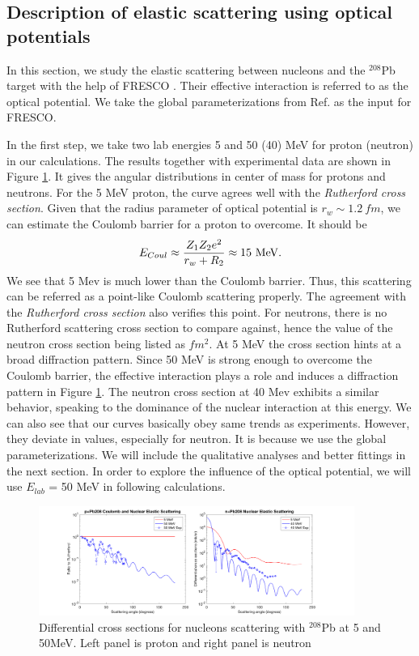 \subsection{Description of elastic scattering using optical potentials}
	In this section, we study the elastic scattering between nucleons and the $^{208}$Pb target with the help of FRESCO\cite{FRESCO} . Their effective interaction is referred to as the optical potential. We take the global parameterizations from Ref. \cite{capote2009ripl,koning2003local} as the input for FRESCO.
	
	In the first step, we take two lab energies 5 and 50 (40) MeV for proton (neutron) in our calculations. The results together with experimental data are shown in Figure \ref{fig:angulardistribution}. It gives the angular distributions in center of mass for protons and neutrons. For the 5 MeV proton, the curve agrees well with the \emph{Rutherford cross section}. Given that the radius parameter of optical potential is $r_w\sim1.2\ fm$, we can estimate the Coulomb barrier for a proton to overcome. It should be 
	\begin{equation}
	E_{Coul}\approx\frac{Z_1Z_2e^2}{r_w+R_2}\approx15\ \rm{MeV}.
	\end{equation}
	We see that 5 Mev is much lower than the Coulomb barrier. Thus, this scattering can be referred as a point-like Coulomb scattering properly. The agreement with the \emph{Rutherford cross section} also verifies this point.
	For neutrons, there is no Rutherford scattering cross section to compare against, hence the value of the neutron cross section being listed as $fm^2$. At 5 MeV the cross section hints at a broad diffraction pattern.
	Since 50 MeV is strong enough to overcome the Coulomb barrier, the effective interaction plays a role and induces a diffraction pattern in Figure \ref{fig:angulardistribution}. The neutron cross section at 40 Mev exhibits a similar behavior, speaking to the dominance of the nuclear interaction at this energy. We can also see that our curves basically obey same trends as experiments. However, they deviate in values, especially for neutron. It is because we use the global parameterizations. We will include the qualitative analyses and better fittings in the next section. In order to explore the influence of the optical potential, we will use $E_{lab}$ = 50 MeV in following calculations.
	
	\begin{figure}[t]
	\centering
	\includegraphics[width=0.92\textwidth]{5.png}
	\caption{Differential cross sections for nucleons scattering with $^{208}$Pb at 5 and 50MeV. Left panel is proton and right panel is neutron  }
	\label{fig:angulardistribution}
	\end{figure}
	

